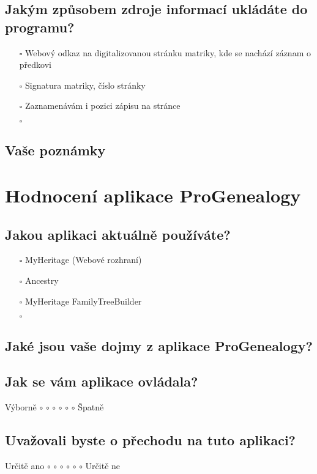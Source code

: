 		\subsection*{Jakým způsobem zdroje informací ukládáte do programu?}
		\begin{itemize}
			\item[$\square$] Webový odkaz na digitalizovanou stránku matriky, kde se nachází záznam o předkovi
			\item[$\square$] Signatura matriky, číslo stránky
			\item[$\square$] Zaznamenávám i pozici zápisu na stránce
			\item[$\square$] \dotfill
		\end{itemize}
		\subsection*{Vaše poznámky}
		\dotfill

	\newpage
	\section{Hodnocení aplikace ProGenealogy}
		\label{append:formHodnoceni}
		\subsection*{Jakou aplikaci aktuálně používáte?}
		\begin{itemize}
			\item[$\square$] MyHeritage (Webové rozhraní)
			\item[$\square$] Ancestry
			\item[$\square$] MyHeritage FamilyTreeBuilder
			\item[$\square$] \dotfill
		\end{itemize}
		\subsection*{Jaké jsou vaše dojmy z aplikace ProGenealogy?}
		\dotfill
		\subsection*{Jak se vám aplikace ovládala?}
		Výborně    \quad $\circ$ $\circ$ $\circ$ $\circ$ $\circ$ $\circ$ \quad Špatně
		\subsection*{Uvažovali byste o přechodu na tuto aplikaci?}
		Určitě ano \quad $\circ$ $\circ$ $\circ$ $\circ$ $\circ$ $\circ$ \quad Určitě ne

